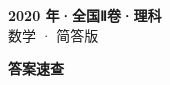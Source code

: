 \documentclass[zihao=-4, a4paper]{ctexart}
\begin{document}
\begin{center}
  {\Large\bfseries 2020 年·全国Ⅱ卷·理科}\\[4pt]
  {\large 数学 · 简答版}
\end{center}
\medskip
{}

\clearpage
{}
\begin{center}{\Large\bfseries 答案速查}\end{center}
\medskip

\end{document}
